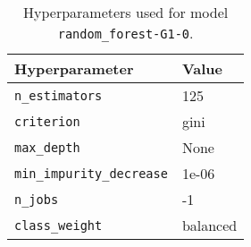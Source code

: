 \begin{table}[H]
\centering
\begin{tabularx}{0.48\textwidth}{|X|l|}
\hline
Hyperparameter & Value \\
\hline
\texttt{n\_estimators} & 125 \\
\texttt{criterion} & gini \\
\texttt{max\_depth} & None \\
\texttt{min\_impurity\_decrease} & 1e-06 \\
\texttt{n\_jobs} & -1 \\
\texttt{class\_weight} & balanced \\
\hline
\end{tabularx}
\caption{Hyperparameters used for model \texttt{random\_forest-G1-0}.}
\label{tab:hyperparameters_best_random_forest}

\end{table}
